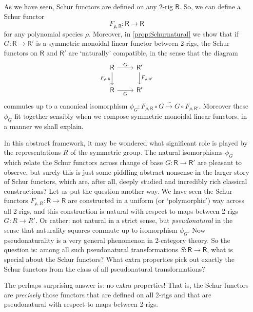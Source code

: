 \documentclass[12pt,reqno]{amsart}
\theoremstyle{plain}
\theoremstyle{definition}
\theoremstyle{remark}
\newcommand{\maps}{\colon}
\newcommand{\category}[1]{\mathsf{#1}}
\newcommand{\R}{\category R}
\numberwithin{thm}{section}
\begin{document}
As we have seen, Schur functors are defined on any 2-rig $\R$. So, we can define a Schur functor 
\[
    F_{\rho, \R} \maps \R \to \R
\] 
for any polynomial species $\rho$. Moreover, in \cref{prop:Schurnatural} we show that if $G \maps \R \to \R'$ is a symmetric monoidal linear functor between 2-rigs, the Schur functors on $\R$ and $\R'$ are `naturally' compatible, in the sense that the diagram 
\[
\begin{tikzcd}
    \R
    \arrow[r, "G"]
    \arrow[d, swap, "F_{\rho, \R}"]
    &
    \R'
    \arrow[d, "F_{\rho, \R'}"]
    \\
    \R
    \arrow[r, swap, "G"]
    &
    \R'
\end{tikzcd}
\] 
commutes up to a canonical isomorphism $\phi_G \maps F_{\rho, \R} \circ G \xrightarrow{\sim} G \circ F_{\rho, \R'}$. Moreover these $\phi_G$ fit together sensibly when we compose symmetric monoidal linear functors, in a manner we shall explain.

In this abstract framework, it may be wondered what significant role is played by the representations $R$ of the symmetric group. The natural isomorphisms $\phi_G$ which relate the Schur functors across change of base $G \maps \R \to \R'$ are pleasant to observe, but surely this is just some piddling abstract nonsense in the larger story of Schur functors, which are, after all, deeply studied and incredibly rich classical constructions? 
Let us put the question another way. We have seen the Schur functors $F_{\rho, R} \maps \R \to \R$ are constructed in a uniform (or `polymorphic') way across all 2-rigs, and this construction is natural with respect to maps between 2-rigs $G \maps R \to R'$. Or rather: not natural in a strict sense, but \emph{pseudonatural} in the sense that naturality squares commute up to isomorphism $\phi_G$. Now pseudonaturality is a very general phenomenon in 2-category theory. So the question is: among all such pseudonatural transformations $S \maps \R \to \R$, what is special about the Schur functors? What extra properties pick out exactly the Schur functors from the class of all pseudonatural transformations? 

The perhaps surprising answer is: no extra properties! That is, the Schur functors are \emph{precisely} those functors that are defined on all 2-rigs and that are pseudonatural with respect to maps between 2-rigs.
\end{document}
